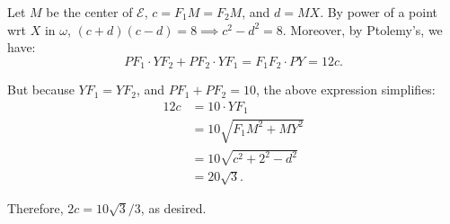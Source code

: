 \begin{solution}
Let $M$ be the center of $\mathcal{E}$, $c = F_1M = F_2M$, and $d = MX$. By power of a point wrt $X$ in $\omega$, $(c+d)(c-d) = 8\implies c^2-d^2=8$. Moreover, by Ptolemy's, we have: 
\[PF_1\cdot YF_2 + PF_2\cdot YF_1 = F_1F_2\cdot PY = 12c.\]

But because $YF_1=YF_2$, and $PF_1+PF_2=10$, the above expression simplifies:
\begin{align*}
    12c &= 10\cdot YF_1 \\
    &= 10\sqrt{F_1M^2 + MY^2} \\ 
    &= 10\sqrt{c^2 + 2^2 - d^2} \\
    &= 20\sqrt{3}.
\end{align*}

Therefore, $2c = 10\sqrt{3}/3$, as desired.
\end{solution}\V